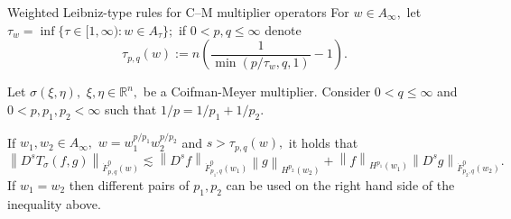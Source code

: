\documentclass[xcolor=dvipsnames]{beamer}
\newcommand{\re}{\mathbb{R}}
\newcommand{\rn}{{{\mathbb R}^n}}
\newcommand{\abs}[1]{\vert #1 \vert}
\newcommand{\norm}[2]{{\left\| #1 \right\|}_{#2}}
\newcommand{\sw}{{\mathcal{S}}(\rn)}
\newcommand{\dx}{\, dx}
\newcommand{\tlw}[4]{\dot F_{#1,#3}^{#2}(#4)} %
\newcommand{\hcline}{1/p=1/p_1+1/p_2}
\begin{document}
%



\begin{frame}{Weighted Leibniz-type rules for C--M multiplier operators}
For $w\in A_\infty,$  let $\tau_w=\inf\{\tau\in [1,\infty): w\in A_\tau\};$ if  $0<p,q\le \infty$ denote 
\begin{equation*}
\tau_{p,q}(w) := n \left(\frac{1}{\min(p/\tau_w,q,1)} - 1 \right).
\end{equation*} 

\begin{theorem}[Naibo--T., 2018]\label{thm:CM:TL:B}  
Let $\sigma(\xi,\eta),$ $\xi,\eta\in\rn,$ be a Coifman-Meyer multiplier. Consider  $0 < q \leq \infty$ and $0 < p, p_1, p_2  < \infty$  such that $\hcline.$ 

\medskip

If  $w_1,w_2\in A_\infty,$ $w=w_1^{{p}/{p_1}} w_2^{{p}/{p_2}}$  and  $s > \tau_{p,q}(w),$  it holds that
\begin{equation*}
\norm{D^s T_\sigma(f,g)}{\tlw{p}{0}{q}{w}} \lesssim \norm{D^s f}{\tlw{p_1}{0}{q}{w_1} } \norm{g}{H^{p_2}(w_2)} +  \norm{f}{H^{p_1}(w_1)}   \norm{D^s g}{\tlw{p_2}{0}{q}{w_2} }.
\end{equation*}
If $w_1=w_2$ then different pairs of $p_1, p_2$ can be used on the right hand side of the inequality above.
\end{theorem}
\end{frame}
\end{document}
